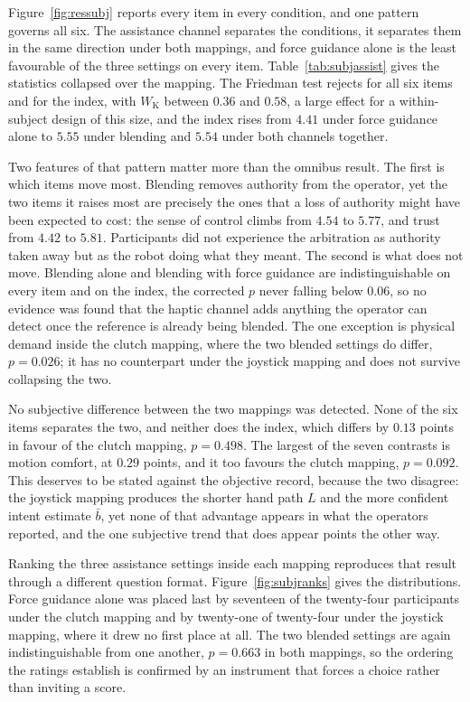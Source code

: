 \documentclass[12pt,a4paper,twoside,openright]{report}
\begin{document}
Figure~\ref{fig:ressubj} reports every item in every condition, and one pattern governs all six. The assistance channel separates the conditions, it separates them in the same direction under both mappings, and force guidance alone is the least favourable of the three settings on every item. Table~\ref{tab:subjassist} gives the statistics collapsed over the mapping. The Friedman test rejects for all six items and for the index, with $W_{\mathrm{K}}$ between $0.36$ and $0.58$, a large effect for a within-subject design of this size, and the index rises from $4.41$ under force guidance alone to $5.55$ under blending and $5.54$ under both channels together.

Two features of that pattern matter more than the omnibus result. The first is which items move most. Blending removes authority from the operator, yet the two items it raises most are precisely the ones that a loss of authority might have been expected to cost: the sense of control climbs from $4.54$ to $5.77$, and trust from $4.42$ to $5.81$. Participants did not experience the arbitration as authority taken away but as the robot doing what they meant. The second is what does not move. Blending alone and blending with force guidance are indistinguishable on every item and on the index, the corrected $p$ never falling below $0.06$, so no evidence was found that the haptic channel adds anything the operator can detect once the reference is already being blended. The one exception is physical demand inside the clutch mapping, where the two blended settings do differ, $p = 0.026$; it has no counterpart under the joystick mapping and does not survive collapsing the two.

No subjective difference between the two mappings was detected. None of the six items separates the two, and neither does the index, which differs by $0.13$ points in favour of the clutch mapping, $p = 0.498$. The largest of the seven contrasts is motion comfort, at $0.29$ points, and it too favours the clutch mapping, $p = 0.092$. This deserves to be stated against the objective record, because the two disagree: the joystick mapping produces the shorter hand path $L$ and the more confident intent estimate $\bar{b}$, yet none of that advantage appears in what the operators reported, and the one subjective trend that does appear points the other way.



Ranking the three assistance settings inside each mapping reproduces that result through a different question format. Figure~\ref{fig:subjranks} gives the distributions. Force guidance alone was placed last by seventeen of the twenty-four participants under the clutch mapping and by twenty-one of twenty-four under the joystick mapping, where it drew no first place at all. The two blended settings are again indistinguishable from one another, $p = 0.663$ in both mappings, so the ordering the ratings establish is confirmed by an instrument that forces a choice rather than inviting a score.
\end{document}
